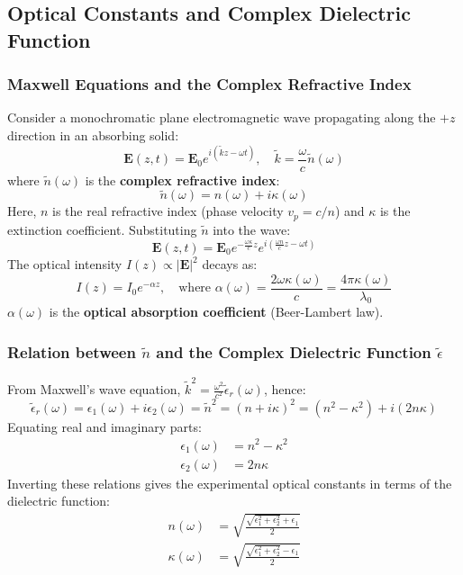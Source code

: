 \documentclass[11pt,a4paper]{article}
\begin{document}
\subsection{Optical Constants and Complex Dielectric Function}
\subsubsection{Maxwell Equations and the Complex Refractive Index}
Consider a monochromatic plane electromagnetic wave propagating along the $+z$ direction in an absorbing solid:
\begin{equation}
    \mathbf{E}(z, t) = \mathbf{E}_0 e^{i(\tilde{k}z - \omega t)}, \quad \tilde{k} = \frac{\omega}{c}\tilde{n}(\omega)
\end{equation}
where $\tilde{n}(\omega)$ is the \textbf{complex refractive index}:
\begin{equation}
    \tilde{n}(\omega) = n(\omega) + i\kappa(\omega)
\end{equation}
Here, $n$ is the real refractive index (phase velocity $v_p = c/n$) and $\kappa$ is the extinction coefficient. Substituting $\tilde{n}$ into the wave:
\begin{equation}
    \mathbf{E}(z, t) = \mathbf{E}_0 e^{-\frac{\omega\kappa}{c}z} e^{i\left(\frac{\omega n}{c}z - \omega t\right)}
\end{equation}
The optical intensity $I(z) \propto |\mathbf{E}|^2$ decays as:
\begin{equation}
    I(z) = I_0 e^{-\alpha z}, \quad \text{where } \alpha(\omega) = \frac{2\omega\kappa(\omega)}{c} = \frac{4\pi\kappa(\omega)}{\lambda_0}
\end{equation}
$\alpha(\omega)$ is the \textbf{optical absorption coefficient} (Beer-Lambert law).

\subsubsection{Relation between \texorpdfstring{$\tilde{n}$}{n} and the Complex Dielectric Function \texorpdfstring{$\tilde{\epsilon}$}{epsilon}}
From Maxwell's wave equation, $\tilde{k}^2 = \frac{\omega^2}{c^2}\tilde{\epsilon}_r(\omega)$, hence:
\begin{equation}
    \tilde{\epsilon}_r(\omega) = \epsilon_1(\omega) + i \epsilon_2(\omega) = \tilde{n}^2 = (n + i\kappa)^2 = (n^2 - \kappa^2) + i(2n\kappa)
\end{equation}
Equating real and imaginary parts:
\begin{align}
    \epsilon_1(\omega) &= n^2 - \kappa^2 \\
    \epsilon_2(\omega) &= 2n\kappa
\end{align}
Inverting these relations gives the experimental optical constants in terms of the dielectric function:
\begin{align}
    n(\omega) &= \sqrt{\frac{\sqrt{\epsilon_1^2 + \epsilon_2^2} + \epsilon_1}{2}} \\
    \kappa(\omega) &= \sqrt{\frac{\sqrt{\epsilon_1^2 + \epsilon_2^2} - \epsilon_1}{2}}
\end{align}
\end{document}

